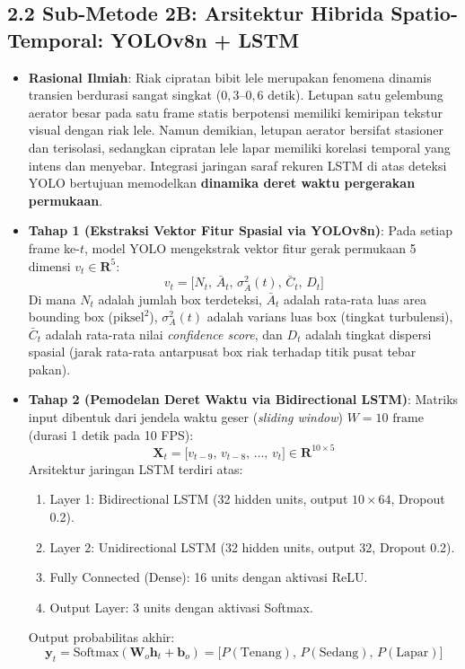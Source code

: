 \documentclass[10pt,a4paper]{article}
\providecommand{\text}[1]{\mbox{#1}}
\begin{document}
\subsection*{2.2 Sub-Metode 2B: Arsitektur Hibrida Spatio-Temporal: YOLOv8n + LSTM}
\begin{itemize}
    \item \textbf{Rasional Ilmiah}: Riak cipratan bibit lele merupakan fenomena dinamis transien berdurasi sangat singkat ($0{,}3\text{--}0{,}6\text{ detik}$). Letupan satu gelembung aerator besar pada satu frame statis berpotensi memiliki kemiripan tekstur visual dengan riak lele. Namun demikian, letupan aerator bersifat stasioner dan terisolasi, sedangkan cipratan lele lapar memiliki korelasi temporal yang intens dan menyebar. Integrasi jaringan saraf rekuren LSTM di atas deteksi YOLO bertujuan memodelkan \textbf{dinamika deret waktu pergerakan permukaan}.
    
    \item \textbf{Tahap 1 (Ekstraksi Vektor Fitur Spasial via YOLOv8n)}:
    Pada setiap frame ke-$t$, model YOLO mengekstrak vektor fitur gerak permukaan 5 dimensi $v_t \in \mathbf{R}^5$:
    \begin{equation}
        v_t = \Big[ N_t,\, \bar{A}_t,\, \sigma_A^2(t),\, \bar{C}_t,\, D_t \Big]
    \end{equation}
    Di mana $N_t$ adalah jumlah box terdeteksi, $\bar{A}_t$ adalah rata-rata luas area bounding box ($\text{piksel}^2$), $\sigma_A^2(t)$ adalah varians luas box (tingkat turbulensi), $\bar{C}_t$ adalah rata-rata nilai \textit{confidence score}, dan $D_t$ adalah tingkat dispersi spasial (jarak rata-rata antarpusat box riak terhadap titik pusat tebar pakan).

    \item \textbf{Tahap 2 (Pemodelan Deret Waktu via Bidirectional LSTM)}:
    Matriks input dibentuk dari jendela waktu geser (\textit{sliding window}) $W = 10\text{ frame}$ (durasi 1 detik pada 10 FPS):
    \begin{equation}
        \mathbf{X}_t = \big[ v_{t-9},\, v_{t-8},\, \dots,\, v_t \big] \in \mathbf{R}^{10 \times 5}
    \end{equation}
    Arsitektur jaringan LSTM terdiri atas:
    \begin{enumerate}
        \item Layer 1: Bidirectional LSTM (32 hidden units, output $10 \times 64$, Dropout 0.2).
        \item Layer 2: Unidirectional LSTM (32 hidden units, output 32, Dropout 0.2).
        \item Fully Connected (Dense): 16 units dengan aktivasi ReLU.
        \item Output Layer: 3 units dengan aktivasi Softmax.
    \end{enumerate}
    Output probabilitas akhir:
    \begin{equation}
        \mathbf{y}_t = \text{Softmax}(\mathbf{W}_o \mathbf{h}_t + \mathbf{b}_o) = \big[ P(\text{Tenang}),\, P(\text{Sedang}),\, P(\text{Lapar}) \big]
    \end{equation}
\end{itemize}
\end{document}
